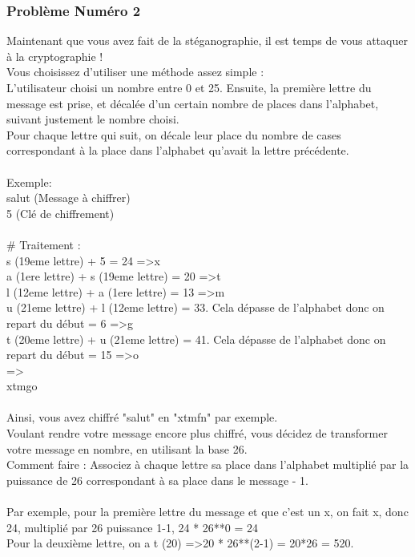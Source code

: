 \documentclass[12pt]{article}
\begin{document}
\subsubsection{Problème Numéro 2}

Maintenant que vous avez fait de la stéganographie, il est temps de vous attaquer à la cryptographie !\\
Vous choisissez d'utiliser une méthode assez simple :\\
L'utilisateur choisi un nombre entre 0 et 25. Ensuite, la première lettre du message est prise, et décalée d'un certain nombre de places dans l'alphabet, suivant justement le nombre choisi.\\
Pour chaque lettre qui suit, on décale leur place du nombre de cases correspondant à la place dans l'alphabet qu'avait la lettre précédente.
\\\\
Exemple:\\
salut (Message à chiffrer)\\
5 (Clé de chiffrement)
\\\\
\# Traitement :\\
s (19eme lettre) + 5 = 24 =\textgreater x\\
a (1ere lettre) + s (19eme lettre) = 20 =\textgreater t\\
l (12eme lettre) + a (1ere lettre) = 13 =\textgreater m\\
u (21eme lettre) + l (12eme lettre) = 33. Cela dépasse de l'alphabet donc on repart du début = 6 =\textgreater g\\
t (20eme lettre) + u (21eme lettre) = 41. Cela dépasse de l'alphabet donc on repart du début = 15 =\textgreater o\\
=\textgreater\\
xtmgo
\\\\
Ainsi, vous avez chiffré "salut" en "xtmfn" par exemple.\\
Voulant rendre votre message encore plus chiffré, vous décidez de transformer votre message en nombre, en utilisant la base 26.\\
Comment faire : Associez à chaque lettre sa place dans l'alphabet multiplié par la puissance de 26 correspondant à sa place dans le message - 1.
\\\\
Par exemple, pour la première lettre du message et que c'est un x, on fait x, donc 24, multiplié par 26 puissance 1-1, 24 * 26**0 = 24\\
Pour la deuxième lettre, on a t (20) =\textgreater 20 * 26**(2-1) = 20*26 = 520.\\
\end{document}
